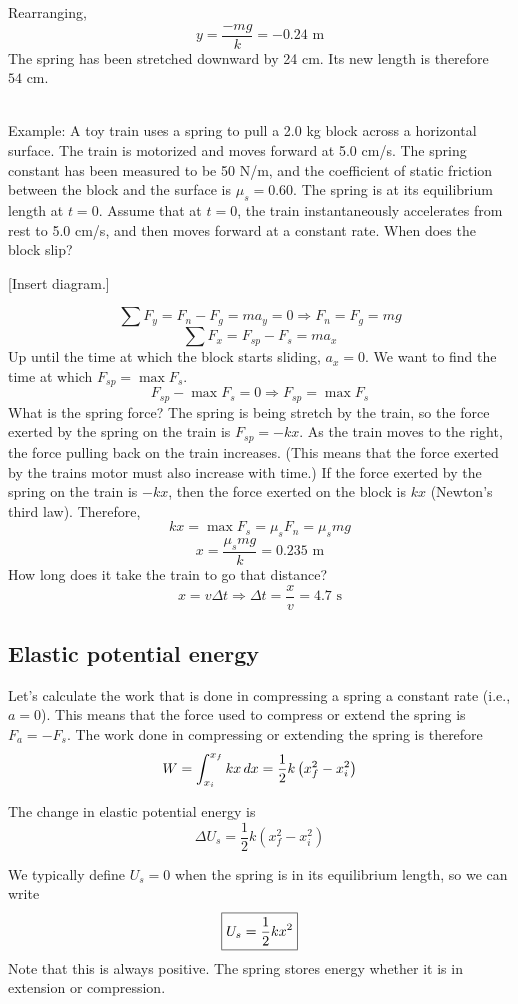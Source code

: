 Rearranging,
$${y}=\frac{-mg}{k}=-0.24\mbox{ m}$$
The spring has been stretched downward by 24 cm. Its new length is therefore $\boxed{54\mbox{ cm}}$.

\hrulefill\\
Example: A toy train uses a spring to pull a 2.0 kg block across a horizontal surface. The train is motorized and moves forward at 5.0 cm/s. The spring constant has been measured to be 50 N/m, and the coefficient of static friction between the block and the surface is $\mu_s=0.60$. The spring is at its equilibrium length at $t=0$. Assume that at $t=0$, the train instantaneously accelerates from rest to 5.0 cm/s, and then moves forward at a constant rate. When does the block slip?

[Insert diagram.]
\vspace{5cm}

$$\sum F_y = F_n-F_g=ma_y=0 \Rightarrow F_n=F_g=mg$$
$$\sum F_x = F_{sp}-F_s=ma_x$$
Up until the time at which the block starts sliding, $a_x=0$. We want to find the time at which $F_{sp}=\max F_s$.
$$F_{sp}-\max F_s=0\Rightarrow F_{sp}=\max F_s$$
What is the spring force? The spring is being stretch by the train, so the force exerted by the spring on the train is $F_{sp}=-kx$. As the train moves to the right, the force pulling back on the train increases. (This means that the force exerted by the trains motor must also increase with time.) If the force exerted by the spring on the train is $-kx$, then the force exerted on the block is $kx$ (Newton's third law). Therefore,
$$kx=\max F_s=\mu_s F_n=\mu_s mg$$
$$x=\frac{\mu_s mg}{k}=0.235\mbox{ m}$$
How long does it take the train to go that distance?
$$x=v\Delta{t}\Rightarrow \Delta{t}=\frac{x}{v}=4.7\mbox{ s}$$

\subsection*{Elastic potential energy}
Let's calculate the work that is done in compressing a spring a constant rate (i.e., $a=0$). This means that the force used to compress or extend the spring is $F_a=-F_s$. The work done in compressing or extending the spring is therefore
$$W=\displaystyle\int_{x_i}^{x_f}kx\,dx=\frac{1}{2}k\left(x_f^2-x_i^2\right)$$

The change in elastic potential energy is
$$\boxed{\Delta U_s=\frac{1}{2}k\left(x_f^2-x_i^2\right)}$$

We typically define $U_s=0$ when the spring is in its equilibrium length, so we can write
$$\boxed{U_s=\frac{1}{2}kx\displaystyle^2}$$
Note that this is always positive. The spring stores energy whether it is in extension or compression.

